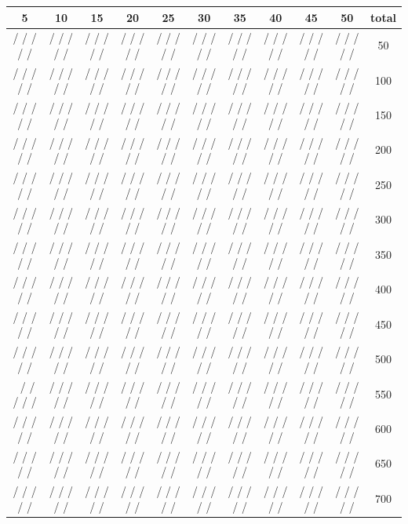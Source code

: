 \begin{appendices}
\begin{landscape}
 \begin{tabular}{ccccccccccc}
 \hline
    5 & 10 & 15 & 20 & 25 & 30 & 35 & 40 & 45 & 50 & total \\ \hline
    / / / / / & / / / / / & / / / / / & / / / / / & / / / / / & / / / / / & / / / / / & / / / / / & / / / / / & / / / / /  & 50 \\
     / / / / / & / / / / / & / / / / / & / / / / / & / / / / / & / / / / / & / / / / / & / / / / / & / / / / / & / / / / /  & 100 \\
      / / / / / & / / / / / & / / / / / & / / / / / & / / / / / & / / / / / & / / / / / & / / / / / & / / / / / & / / / / / & 150 \\
       / / / / / & / / / / / & / / / / / & / / / / / & / / / / / & / / / / / & / / / / / & / / / / / & / / / / / & / / / / /  & 200\\
        / / / / / & / / / / / & / / / / / & / / / / / & / / / / / & / / / / / & / / / / / & / / / / / & / / / / / & / / / / /  & 250 \\
         / / / / / & / / / / / & / / / / / & / / / / / & / / / / / & / / / / / & / / / / / & / / / / / & / / / / / & / / / / /  & 300 \\
     / / / / / & / / / / / & / / / / / & / / / / / & / / / / / & / / / / / & / / / / / & / / / / / & / / / / / & / / / / / & 350 \\
      / / / / / & / / / / / & / / / / / & / / / / / & / / / / / & / / / / / & / / / / / & / / / / / & / / / / / & / / / / /  & 400 \\
       / / / / / & / / / / / & / / / / / & / / / / / & / / / / / & / / / / / & / / / / / & / / / / / & / / / / / & / / / / / & 450 \\
        / / / / / & / / / / / & / / / / / & / / / / / & / / / / / & / / / / / & / / / / / & / / / / / & / / / / / & / / / / / & 500 \\ \
         / / / / / & / / / / / & / / / / / & / / / / / & / / / / / & / / / / / & / / / / / & / / / / / & / / / / / & / / / / /  & 550 \\
     / / / / / & / / / / / & / / / / / & / / / / / & / / / / / & / / / / / & / / / / / & / / / / / & / / / / / & / / / / /  & 600 \\
      / / / / / & / / / / / & / / / / / & / / / / / & / / / / / & / / / / / & / / / / / & / / / / / & / / / / / & / / / / / & 650 \\
       / / / / / & / / / / / & / / / / / & / / / / / & / / / / / & / / / / / & / / / / / & / / / / / & / / / / / & / / / / /  & 700\\

\end{tabular}
\end{landscape}
\end{appendices}
